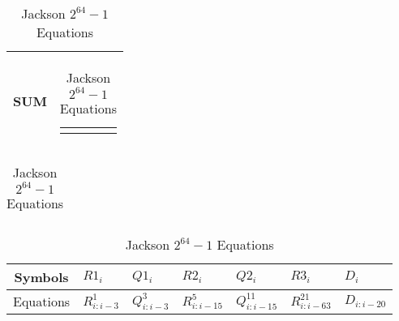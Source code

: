\begin{table}[H]
\begin{tabularx}{\textwidth}{|| c | X ||}
        SUM   & 
        \begin{tabular}{@{}c@{}}$ sum_i = R2_{i-1}\ ?\ (x_i \oplus D_{i-1})\ :\ x_i$
        \end{tabular}\\\hline
    \end{tabularx}
    

    
    \begin{tabularx}{\textwidth}{X} 
    \\
    \end{tabularx}  
    
    
    \begin{tabularx}{\textwidth}{| c | X X X X X X | } 
        \hline
        Symbols & $R1_i$ & $Q1_i$ & $R2_i$ & $Q2_i$ & $R3_i$ & $D_i$ \\
        \hline
        Equations & $R^1_{i:i-3}$ & $Q^3_{i:i-3}$ & $R^5_{i:i-15}$ & $Q^{11}_{i:i-15}$ 
        & $R^{21}_{i:i-63}$ & $ D_{i:i-20}$ \\
        \hline
    \end{tabularx}
    
\caption{Jackson $2^{64}-1$ Equations}
\end{table}







%





